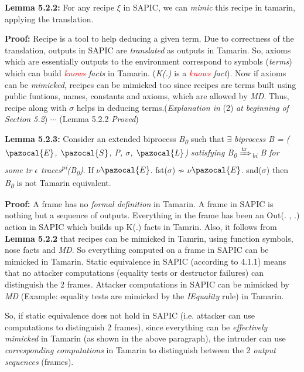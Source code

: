 \documentclass[11pt]{article}
\newcommand{\Sa}{\pazocal{S}}
\newcommand{\Lb}{\pazocal{L}}
\newcommand{\Ea}{\pazocal{E}}
\newcommand{\jannik}[1]{\textcolor{red}{#1}}
\begin{document}
{\bf Lemma 5.2.2: }For any recipe $\xi$ in SAPIC, we can {\it mimic} this recipe in tamarin, applying the translation.   \newline

{\bf Proof: }Recipe is a tool to help deducing a given term.  Due to correctness of the translation, outputs in SAPIC are {\it translated} as outputs in Tamarin. So, axioms which are essentially outputs to the environment correspond to symbols ({\it terms}) which can build {\it \jannik{knows} facts} in Tamarin. ({\it K(.)} is a {\it \jannik{knows} fact}). Now if axioms can be {\it mimicked}, recipes can be mimicked too since recipes are terms built using public funtions, names, constants and axioms, which are allowed by {\it MD}. Thus, recipe along with $\sigma$ helps in deducing terms.({\it Explanation in} (2) {\it at beginning of Section 5.2}) \hfill \hfill $\cdots$ (Lemma 5.2.2 {\it Proved})\newline

{\bf Lemma 5.2.3: }Consider an extended biprocess {\it B\textsubscript{0}} such that $\exists$ {\it biprocess B = ($\Ea$, $\Sa$, P, $\sigma$, $\Lb$) satisfying B\textsubscript{0} {$\xRightarrow[\text{}]{\text{tr}}$}\textsubscript{bi} B for some tr $\epsilon$ traces\textsuperscript{pi}(B\textsubscript{0})}. If $\nu$$\Ea$. fst($\sigma$) $\not\sim$ $\nu$$\Ea$. snd($\sigma$) then {\it B\textsubscript{0}} is not Tamarin equivalent.\newline

{\bf Proof: }A frame has no {\it formal definition} in Tamarin. A frame in SAPIC is nothing but a sequence of outputs. Everything in the frame has been an Out(. , .) action in SAPIC which builds up K(.) facts in Tamrin. Also, it follows from {\bf Lemma 5.2.2} that recipes can be mimicked in Tamrin, using function symbols, nose facts and {\it MD}. So everything computed on a frame in SAPIC can be mimicked in Tamarin. Static equivalence in SAPIC (according to 4.1.1) means that no attacker computations (equality tests or destructor failures) can distinguish the 2 frames. Attacker computations in SAPIC can be mimicked by {\it MD} (Example: equality tests are mimicked by the {\it IEquality} rule) in Tamarin.\newline 

So, if static equivalence does not hold in SAPIC (i.e. attacker can use computations to distinguish 2 frames), since everything can be {\it effectively mimicked} in Tamarin (as shown in the above paragraph), the intruder can use {\it corresponding computations} in Tamarin to distinguish between the 2 {\it output sequences} (frames).\newline
\end{document}
